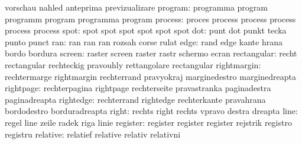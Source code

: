                            vorschau                  nahled
                           anteprima                 previzualizare
                  program: programma                 program
                           programm                  program
                           programma                 program
process: proces   process
         process  process
         process  process
   spot: spot spot
         spot spot
         spot spot
                      dot: punt                      dot
                           punkt                     tecka
                           punto                     punct
                      ran: ran                       ran
                           ran                       rozsah
                           corse                     rulat
                     edge: rand                      edge
                           kante                     hrana
                           bordo                     bordura
                   screen: raster                    screen
                           raster                    rastr
                           schermo                   ecran
              rectangular: recht                     rectangular
                           rechteckig                pravouhly
                           rettangolare              rectangular
              rightmargin: rechtermarge              rightmargin
                           rechterrand               pravyokraj
                           marginedestro             marginedreapta
                rightpage: rechterpagina             rightpage
                           rechterseite              pravastranka
                           paginadestra              paginadreapta
                rightedge: rechterrand               rightedge
                           rechterkante              pravahrana
                           bordodestro               borduradreapta
                    right: rechts                    right
                           rechts                    vpravo
                           destra                    dreapta
                     line: regel                     line
                           zeile                     radek
                           riga                      linie
                 register: register                  register
                           register                  rejstrik
                           registro                  registru
                 relative: relatief                  relative
                           relativ                   relativni
